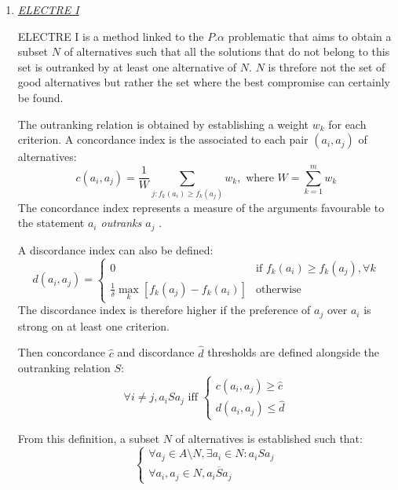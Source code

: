 \begin{enumerate}
\item \textit{\underline{ELECTRE I}}

ELECTRE I is a method linked to the $P.\alpha$ problematic that aims to obtain a subset $N$ of alternatives such that all the solutions that do not belong to this set is outranked by at least one alternative of $N$. $N$ is threfore not the set of good alternatives but rather the set where the best compromise can certainly be found.

The outranking relation is obtained by establishing a weight $w_k$ for each criterion. A concordance index is the associated to each pair $(a_i, a_j)$ of alternatives:
\begin{equation}
c(a_i, a_j) = \frac{1}{W} \sum_{j:f_{k}(a_i) \geq f_{k}(a_j)}{w_{k}}, \text{ where } W = \sum_{k=1}^{m} w_{k}
\end{equation}
The concordance index represents a measure of the arguments favourable to the statement \og \textit{$a_i$ outranks $a_j$} \fg.

A discordance index can also be defined:
\begin{equation}
d(a_i, a_j) = \begin{cases}
	0& \text{if $f_{k}(a_i) \geq f_{k}(a_j), \forall k$}\\
	\frac{1}{\delta} \max_{k} [f_{k}(a_j) - f_{k}(a_i)]& \text{otherwise}
	\end{cases}
\end{equation}
The discordance index is therefore higher if the preference of $a_j$ over $a_i$ is strong on at least one criterion.

Then concordance $\hat{c}$ and discordance $\hat{d}$ thresholds are defined alongside the outranking relation $S$:
\begin{equation}
\forall i \neq j, a_iSa_j \text{ iff } \begin{cases}
	c(a_i, a_j) \geq \hat{c}\\
	d(a_i, a_j) \leq \hat{d}
	\end{cases}
\end{equation}

From this definition, a subset $N$ of alternatives is established such that:
\begin{equation}
\begin {cases}
\forall a_j \in A\setminus N, \exists a_i \in N : a_iSa_j\\
\forall a_i, a_j \in N, a_i \overline{S} a_j
\end{cases}
\end{equation}


\end{enumerate}
